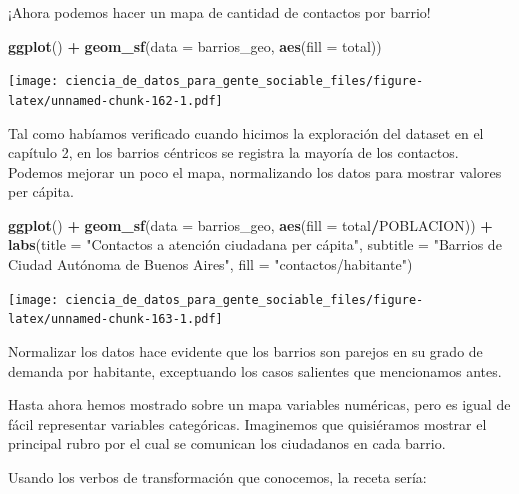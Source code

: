 \documentclass[]{book}
\newenvironment{Shaded}{\begin{snugshade}}{\end{snugshade}}
\newcommand{\KeywordTok}[1]{\textcolor[rgb]{0.13,0.29,0.53}{\textbf{#1}}}
\newcommand{\DataTypeTok}[1]{\textcolor[rgb]{0.13,0.29,0.53}{#1}}
\newcommand{\StringTok}[1]{\textcolor[rgb]{0.31,0.60,0.02}{#1}}
\newcommand{\OperatorTok}[1]{\textcolor[rgb]{0.81,0.36,0.00}{\textbf{#1}}}
\newcommand{\NormalTok}[1]{#1}
\begin{document}
¡Ahora podemos hacer un mapa de cantidad de contactos por barrio!

\begin{Shaded}
\begin{Highlighting}[]
\KeywordTok{ggplot}\NormalTok{() }\OperatorTok{+}\StringTok{ }\KeywordTok{geom_sf}\NormalTok{(}\DataTypeTok{data =}\NormalTok{ barrios_geo, }\KeywordTok{aes}\NormalTok{(}\DataTypeTok{fill =}\NormalTok{ total))}
\end{Highlighting}
\end{Shaded}

\texttt{[image: ciencia\_de\_datos\_para\_gente\_sociable\_files/figure-latex/unnamed-chunk-162-1.pdf]}

Tal como habíamos verificado cuando hicimos la exploración del dataset
en el capítulo 2, en los barrios céntricos se registra la mayoría de los
contactos. Podemos mejorar un poco el mapa, normalizando los datos para
mostrar valores per cápita.

\begin{Shaded}
\begin{Highlighting}[]
\KeywordTok{ggplot}\NormalTok{() }\OperatorTok{+}\StringTok{ }
\StringTok{    }\KeywordTok{geom_sf}\NormalTok{(}\DataTypeTok{data =}\NormalTok{ barrios_geo, }\KeywordTok{aes}\NormalTok{(}\DataTypeTok{fill =}\NormalTok{ total}\OperatorTok{/}\NormalTok{POBLACION)) }\OperatorTok{+}
\StringTok{    }\KeywordTok{labs}\NormalTok{(}\DataTypeTok{title =} \StringTok{"Contactos a atención ciudadana per cápita"}\NormalTok{,}
         \DataTypeTok{subtitle =} \StringTok{"Barrios de Ciudad Autónoma de Buenos Aires"}\NormalTok{,}
         \DataTypeTok{fill =} \StringTok{"contactos/habitante"}\NormalTok{)}
\end{Highlighting}
\end{Shaded}

\texttt{[image: ciencia\_de\_datos\_para\_gente\_sociable\_files/figure-latex/unnamed-chunk-163-1.pdf]}

Normalizar los datos hace evidente que los barrios son parejos en su
grado de demanda por habitante, exceptuando los casos salientes que
mencionamos antes.

Hasta ahora hemos mostrado sobre un mapa variables numéricas, pero es
igual de fácil representar variables categóricas. Imaginemos que
quisiéramos mostrar el principal rubro por el cual se comunican los
ciudadanos en cada barrio.

Usando los verbos de transformación que conocemos, la receta sería:
\end{document}
